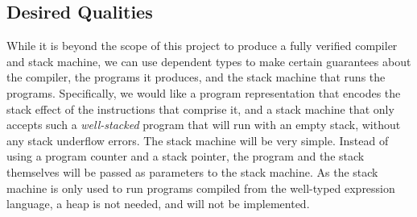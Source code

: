 \subsection{Desired Qualities}
While it is beyond the scope of this project to produce a fully verified compiler and stack machine, we can use dependent types to make certain guarantees about the compiler, the programs it produces, and the stack machine that runs the programs. Specifically, we would like a program representation that encodes the stack effect of the instructions that comprise it, and a stack machine that only accepts such a \textit{well-stacked} program that will run with an empty stack, without any stack underflow errors. The stack machine will be very simple. Instead of using a program counter and a stack pointer, the program and the stack themselves will be passed as parameters to the stack machine. As the stack machine is only used to run programs compiled from the well-typed expression language, a heap is not needed, and will not be implemented.





